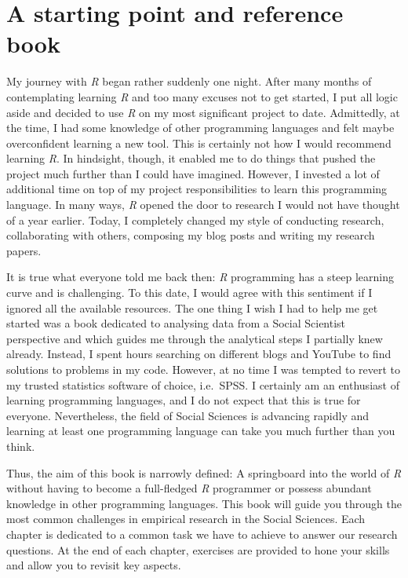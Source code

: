 \documentclass[
  letterpaper,
]{krantz}
\begin{document}
\section{A starting point and reference
book}\label{sec-a-starting-point-and-reference-book}

My journey with \emph{R} began rather suddenly one night. After many
months of contemplating learning \emph{R} and too many excuses not to
get started, I put all logic aside and decided to use \emph{R} on my
most significant project to date. Admittedly, at the time, I had some
knowledge of other programming languages and felt maybe overconfident
learning a new tool. This is certainly not how I would recommend
learning \emph{R}. In hindsight, though, it enabled me to do things that
pushed the project much further than I could have imagined. However, I
invested a lot of additional time on top of my project responsibilities
to learn this programming language. In many ways, \emph{R} opened the
door to research I would not have thought of a year earlier. Today, I
completely changed my style of conducting research, collaborating with
others, composing my blog posts and writing my research papers.

It is true what everyone told me back then: \emph{R} programming has a
steep learning curve and is challenging. To this date, I would agree
with this sentiment if I ignored all the available resources. The one
thing I wish I had to help me get started was a book dedicated to
analysing data from a Social Scientist perspective and which guides me
through the analytical steps I partially knew already. Instead, I spent
hours searching on different blogs and YouTube to find solutions to
problems in my code. However, at no time I was tempted to revert to my
trusted statistics software of choice, i.e.~SPSS. I certainly am an
enthusiast of learning programming languages, and I do not expect that
this is true for everyone. Nevertheless, the field of Social Sciences is
advancing rapidly and learning at least one programming language can
take you much further than you think.

Thus, the aim of this book is narrowly defined: A springboard into the
world of \emph{R} without having to become a full-fledged \emph{R}
programmer or possess abundant knowledge in other programming languages.
This book will guide you through the most common challenges in empirical
research in the Social Sciences. Each chapter is dedicated to a common
task we have to achieve to answer our research questions. At the end of
each chapter, exercises are provided to hone your skills and allow you
to revisit key aspects.
\end{document}

